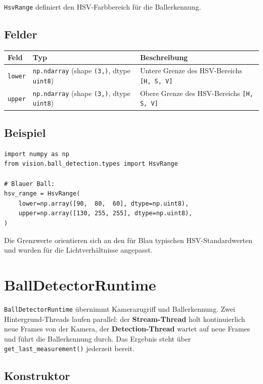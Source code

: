 \documentclass[11pt, a4paper]{scrreprt}
\begin{document}
\texttt{HsvRange} definiert den HSV-Farbbereich für die Ballerkennung.

\subsection*{Felder}

\begin{tabularx}{\textwidth}{l l X}
  \toprule
  Feld & Typ & Beschreibung \\
  \midrule
  \texttt{lower} & \texttt{np.ndarray} (shape \texttt{(3,)}, dtype \texttt{uint8}) & Untere Grenze des HSV-Bereichs \texttt{[H, S, V]} \\
  \texttt{upper} & \texttt{np.ndarray} (shape \texttt{(3,)}, dtype \texttt{uint8}) & Obere Grenze des HSV-Bereichs \texttt{[H, S, V]} \\
  \bottomrule
\end{tabularx}

\subsection*{Beispiel}

\begin{lstlisting}
import numpy as np
from vision.ball_detection.types import HsvRange

# Blauer Ball:
hsv_range = HsvRange(
    lower=np.array([90,  80,  60], dtype=np.uint8),
    upper=np.array([130, 255, 255], dtype=np.uint8),
)
\end{lstlisting}

Die Grenzwerte orientieren sich an den für Blau typischen HSV-Standardwerten und wurden für die Lichtverhältnisse angepasst.

\section{BallDetectorRuntime}

\texttt{BallDetectorRuntime} übernimmt Kamerazugriff und Ballerkennung.
Zwei Hintergrund-Threads laufen parallel: der \textbf{Stream-Thread} holt
kontinuierlich neue Frames von der Kamera, der \textbf{Detection-Thread}
wartet auf neue Frames und führt die Ballerkennung durch.
Das Ergebnis steht über \texttt{get\_last\_measurement()} jederzeit bereit.

\subsection*{Konstruktor}
\end{document}
